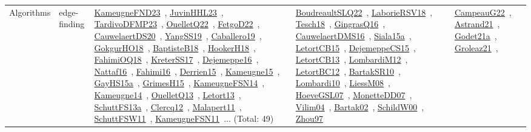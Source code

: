 {\begin{longtable}{lp{3cm}>{\raggedright\arraybackslash}p{6cm}>{\raggedright\arraybackslash}p{6cm}>{\raggedright\arraybackslash}p{8cm}}
Algorithms & edge-finding & \href{works/KameugneFND23.pdf}{KameugneFND23}~\cite{KameugneFND23}, \href{works/JuvinHHL23.pdf}{JuvinHHL23}~\cite{JuvinHHL23}, \href{works/TardivoDFMP23.pdf}{TardivoDFMP23}~\cite{TardivoDFMP23}, \href{works/OuelletQ22.pdf}{OuelletQ22}~\cite{OuelletQ22}, \href{works/FetgoD22.pdf}{FetgoD22}~\cite{FetgoD22}, \href{works/CauwelaertDS20.pdf}{CauwelaertDS20}~\cite{CauwelaertDS20}, \href{works/YangSS19.pdf}{YangSS19}~\cite{YangSS19}, \href{works/Caballero19.pdf}{Caballero19}~\cite{Caballero19}, \href{works/GokgurHO18.pdf}{GokgurHO18}~\cite{GokgurHO18}, \href{works/BaptisteB18.pdf}{BaptisteB18}~\cite{BaptisteB18}, \href{works/HookerH18.pdf}{HookerH18}~\cite{HookerH18}, \href{works/FahimiOQ18.pdf}{FahimiOQ18}~\cite{FahimiOQ18}, \href{works/KreterSS17.pdf}{KreterSS17}~\cite{KreterSS17}, \href{works/Dejemeppe16.pdf}{Dejemeppe16}~\cite{Dejemeppe16}, \href{works/Nattaf16.pdf}{Nattaf16}~\cite{Nattaf16}, \href{works/Fahimi16.pdf}{Fahimi16}~\cite{Fahimi16}, \href{works/Derrien15.pdf}{Derrien15}~\cite{Derrien15}, \href{works/Kameugne15.pdf}{Kameugne15}~\cite{Kameugne15}, \href{works/GayHS15a.pdf}{GayHS15a}~\cite{GayHS15a}, \href{works/GrimesH15.pdf}{GrimesH15}~\cite{GrimesH15}, \href{works/KameugneFSN14.pdf}{KameugneFSN14}~\cite{KameugneFSN14}, \href{works/Kameugne14.pdf}{Kameugne14}~\cite{Kameugne14}, \href{works/OuelletQ13.pdf}{OuelletQ13}~\cite{OuelletQ13}, \href{works/Letort13.pdf}{Letort13}~\cite{Letort13}, \href{works/SchuttFS13a.pdf}{SchuttFS13a}~\cite{SchuttFS13a}, \href{works/Clercq12.pdf}{Clercq12}~\cite{Clercq12}, \href{works/Malapert11.pdf}{Malapert11}~\cite{Malapert11}, \href{works/SchuttFSW11.pdf}{SchuttFSW11}~\cite{SchuttFSW11}, \href{works/KameugneFSN11.pdf}{KameugneFSN11}~\cite{KameugneFSN11}... (Total: 49) & \href{works/BoudreaultSLQ22.pdf}{BoudreaultSLQ22}~\cite{BoudreaultSLQ22}, \href{works/LaborieRSV18.pdf}{LaborieRSV18}~\cite{LaborieRSV18}, \href{works/Tesch18.pdf}{Tesch18}~\cite{Tesch18}, \href{works/GingrasQ16.pdf}{GingrasQ16}~\cite{GingrasQ16}, \href{works/CauwelaertDMS16.pdf}{CauwelaertDMS16}~\cite{CauwelaertDMS16}, \href{works/Siala15a.pdf}{Siala15a}~\cite{Siala15a}, \href{works/LetortCB15.pdf}{LetortCB15}~\cite{LetortCB15}, \href{works/DejemeppeCS15.pdf}{DejemeppeCS15}~\cite{DejemeppeCS15}, \href{works/LetortCB13.pdf}{LetortCB13}~\cite{LetortCB13}, \href{works/LombardiM12.pdf}{LombardiM12}~\cite{LombardiM12}, \href{works/LetortBC12.pdf}{LetortBC12}~\cite{LetortBC12}, \href{works/BartakSR10.pdf}{BartakSR10}~\cite{BartakSR10}, \href{works/Lombardi10.pdf}{Lombardi10}~\cite{Lombardi10}, \href{works/LiessM08.pdf}{LiessM08}~\cite{LiessM08}, \href{works/HoeveGSL07.pdf}{HoeveGSL07}~\cite{HoeveGSL07}, \href{works/MonetteDD07.pdf}{MonetteDD07}~\cite{MonetteDD07}, \href{works/Vilim04.pdf}{Vilim04}~\cite{Vilim04}, \href{works/Bartak02.pdf}{Bartak02}~\cite{Bartak02}, \href{works/SchildW00.pdf}{SchildW00}~\cite{SchildW00}, \href{works/Zhou97.pdf}{Zhou97}~\cite{Zhou97} & \href{works/CampeauG22.pdf}{CampeauG22}~\cite{CampeauG22}, \href{works/Astrand21.pdf}{Astrand21}~\cite{Astrand21}, \href{works/Godet21a.pdf}{Godet21a}~\cite{Godet21a}, \href{works/Groleaz21.pdf}{Groleaz21}~\cite{Groleaz21}, 
\end{longtable}}
